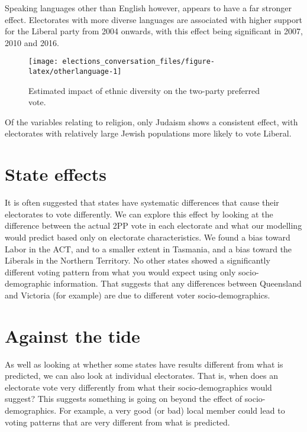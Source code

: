 \documentclass[11pt,a4paper,]{article}
\begin{document}
Speaking languages other than English however, appears to have a far stronger effect. Electorates with more diverse languages are associated with higher support for the Liberal party from 2004 onwards, with this effect being significant in 2007, 2010 and 2016.

\begin{figure}[H]

{\centering \texttt{[image: elections\_conversation\_files/figure-latex/otherlanguage-1]} 

}

\caption{Estimated impact of ethnic diversity on the two-party preferred vote.}\label{fig:otherlanguage}
\end{figure}

Of the variables relating to religion, only Judaism shows a consistent effect, with electorates with relatively large Jewish populations more likely to vote Liberal.

\hypertarget{state-effects}{%
\section{State effects}\label{state-effects}}

It is often suggested that states have systematic differences that cause their electorates to vote differently. We can explore this effect by looking at the difference between the actual 2PP vote in each electorate and what our modelling would predict based only on electorate characteristics. We found a bias toward Labor in the ACT, and to a smaller extent in Tasmania, and a bias toward the Liberals in the Northern Territory. No other states showed a significantly different voting pattern from what you would expect using only socio-demographic information. That suggests that any differences between Queensland and Victoria (for example) are due to different voter socio-demographics.

\hypertarget{against-the-tide}{%
\section{Against the tide}\label{against-the-tide}}

As well as looking at whether some states have results different from what is predicted, we can also look at individual electorates. That is, when does an electorate vote very differently from what their socio-demographics would suggest? This suggests something is going on beyond the effect of socio-demographics. For example, a very good (or bad) local member could lead to voting patterns that are very different from what is predicted.
\end{document}

